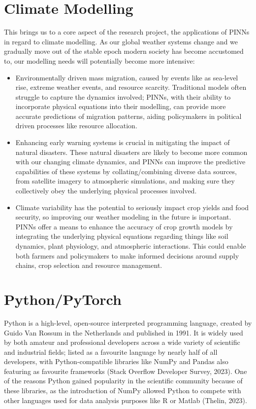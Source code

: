 \documentclass[12pt, openany]{book}
\begin{document}
\section{Climate Modelling}

This brings us to a core aspect of the research project, the applications of PINNs in regard to climate modelling. As our global weather systems change and we gradually move out of the stable epoch modern society has become accustomed to, our modelling needs will potentially become more intensive:

\begin{itemize}
    \item Environmentally driven mass migration, caused by events like as sea-level rise, extreme weather events, and resource scarcity. Traditional models often struggle to capture the dynamics involved; PINNs, with their ability to incorporate physical equations into their modelling, can provide more accurate predictions of migration patterns, aiding policymakers in political driven processes like resource allocation.
    \item Enhancing early warning systems is crucial in mitigating the impact of natural disasters. These natural disasters are likely to become more common with our changing climate dynamics, and PINNs can improve the predictive capabilities of these systems by collating/combining diverse data sources, from satellite imagery to atmospheric simulations, and making sure they collectively obey the underlying physical processes involved.
    \item Climate variability has the potential to seriously impact crop yields and food security, so improving our weather modeling in the future is important. PINNs offer a means to enhance the accuracy of crop growth models by integrating the underlying physical equations regarding things like soil dynamics, plant physiology, and atmospheric interactions. This could enable both farmers and policymakers to make informed decisions around supply chains, crop selection and resource management.
\end{itemize}

\section{Python/PyTorch}

Python is a high-level, open-source interpreted programming language, created by Guido Van Rossum in the Netherlands and published in 1991. It is widely used by both amateur and professional developers across a wide variety of scientific and industrial fields; listed as a favourite language by nearly half of all developers, with Python-compatible libraries like NumPy and Pandas also featuring as favourite frameworks (Stack Overflow Developer Survey, 2023). One of the reasons Python gained popularity in the scientific community because of these libraries, as the introduction of NumPy allowed Python to compete with other languages used for data analysis purposes like R or Matlab (Thelin, 2023). \\
\end{document}
